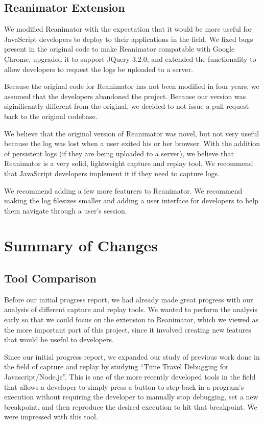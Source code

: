 \documentclass[12pt,journal]{IEEEtran}
\begin{document}
\subsection{Reanimator Extension}
We modified Reanimator with the expectation that it would be more useful for JavaScript developers to deploy to their applications in the field. We fixed bugs present in the original code to make Reanimator compatable with Google Chrome, upgraded it to support JQuery 3.2.0, and extended the functionality to allow developers to request the logs be uploaded to a server.
\par
Because the original code for Reanimator has not been modified in four years, we assumed that the developers abandoned the project. Because our version was siginificantly different from the original, we decided to not issue a pull request back to the original codebase.
\par
We believe that the original version of Reanimator was novel, but not very useful because the log was lost when a user exited his or her browser. With the addition of persistent logs (if they are being uploaded to a server), we believe that Reanimator is a very solid, lightweight capture and replay tool. We recommend that JavaScript developers implement it if they need to capture logs.
\par
We recommend adding a few more featurers to Reanimator. We recommend making the log filesizes smaller and adding a user interface for developers to help them navigate through a user's session.

\section{Summary of Changes}
\subsection{Tool Comparison}
Before our initial progress report, we had already made great progress with our analysis of different capture and replay tools. We wanted to perform the analysis early so that we could focus on the extension to Reanimator, which we viewed as the more important part of this project, since it involved creating new features that would be useful to developers.
\par
Since our initial progress report, we expanded our study of previous work done in the field of capture and replay by studying ``Time Travel Debugging for Javascript/Node.js''. This is one of the more recently developed tools in the field that allows a developer to simply press a button to step-back in a program's execution without requiring the developer to manually stop debugging, set a new breakpoint, and then reproduce the desired execution to hit that breakpoint. We were impressed with this tool.
\end{document}
